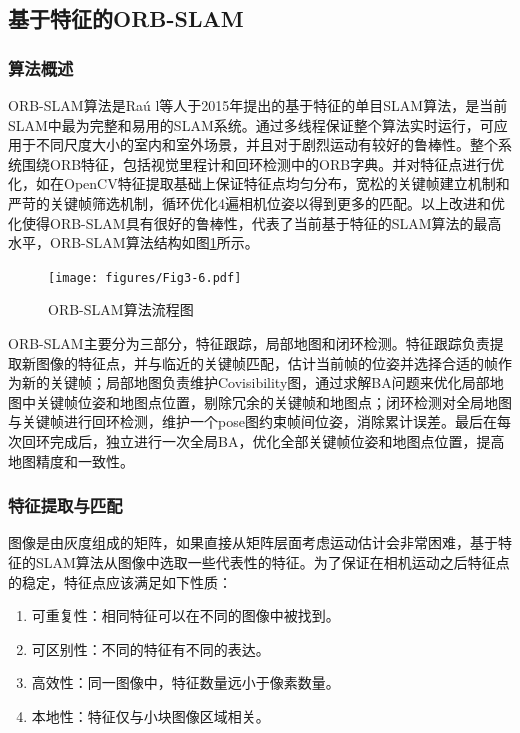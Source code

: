 \subsection{基于特征的ORB-SLAM}

\subsubsection{算法概述}
ORB-SLAM算法是Ra\'u l等人于2015年提出的基于特征的单目SLAM算法，是当前SLAM中最为完整和易用的SLAM系统。通过多线程保证整个算法实时运行，可应用于不同尺度大小的室内和室外场景，并且对于剧烈运动有较好的鲁棒性。整个系统围绕ORB特征\upcite{[3.8]}，包括视觉里程计和回环检测中的ORB字典\upcite{[3.9]}。并对特征点进行优化，如在OpenCV特征提取基础上保证特征点均匀分布，宽松的关键帧建立机制和严苛的关键帧筛选机制，循环优化4遍相机位姿以得到更多的匹配。以上改进和优化使得ORB-SLAM具有很好的鲁棒性，代表了当前基于特征的SLAM算法的最高水平，ORB-SLAM算法结构\upcite{[1.20]}如图\ref{fig3.6}所示。

\begin{figure}[h]
\centering
\texttt{[image: figures/Fig3-6.pdf]}
\caption{ORB-SLAM算法流程图}
\label{fig3.6}
\end{figure}
\vspace{-20pt}

ORB-SLAM主要分为三部分，特征跟踪，局部地图和闭环检测。特征跟踪负责提取新图像的特征点，并与临近的关键帧匹配，估计当前帧的位姿并选择合适的帧作为新的关键帧；局部地图负责维护Covisibility图，通过求解BA问题来优化局部地图中关键帧位姿和地图点位置，剔除冗余的关键帧和地图点；闭环检测对全局地图与关键帧进行回环检测，维护一个pose图约束帧间位姿，消除累计误差。最后在每次回环完成后，独立进行一次全局BA，优化全部关键帧位姿和地图点位置，提高地图精度和一致性。


\subsubsection{特征提取与匹配}
图像是由灰度组成的矩阵，如果直接从矩阵层面考虑运动估计会非常困难，基于特征的SLAM算法从图像中选取一些代表性的特征。为了保证在相机运动之后特征点的稳定，特征点应该满足如下性质：
\begin{enumerate}[label={(\arabic*)}]
\item 可重复性：相同特征可以在不同的图像中被找到。
\item 可区别性：不同的特征有不同的表达。
\item 高效性：同一图像中，特征数量远小于像素数量。
\item 本地性：特征仅与小块图像区域相关。
\end{enumerate}

